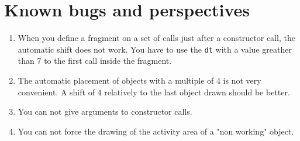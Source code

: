 \documentclass[a4paper,11pt]{report}
\newcommand{\inputTikZ}[1]{%
  }%
\newcommand{\inputTikZ}[1]{%
    \texttt{[image: fig/\#1.pdf]}%
  }%
\begin{document}
\begin{center}
\inputTikZ{seqdiagstep4}
\end{center}

\section{Known bugs and perspectives}\label{s.seqbug}

\begin{enumerate}
\item When you define a fragment on a set of calls just after a constructor call, the automatic shift does not work. You have to use the {\tt dt} with a value greather than 7 to the first call inside the fragment.
\item The automatic placement of objects with a multiple of 4 is not very convenient. A shift of 4 relatively to the last object drawn should be better.
\item You can not give arguments to constructor calls.
\item You can not force the drawing of the activity area of a "non working" object.

\begin{center}
\inputTikZ{bugcall}
\end{center}

\end{enumerate}
\end{document}
